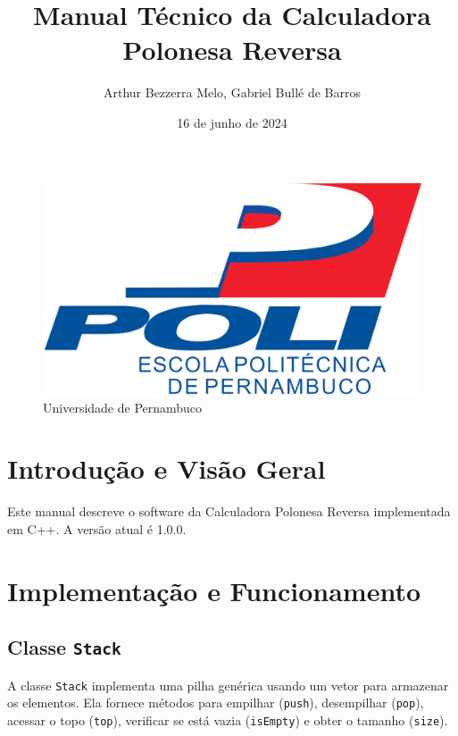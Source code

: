 \documentclass[twocolumn,a4paper,12pt]{article}
\title{Manual Técnico da Calculadora Polonesa Reversa}
\author{Arthur Bezzerra Melo, Gabriel Bullé de Barros}
\date{16 de junho de 2024}
\begin{document}
\maketitle

\begin{figure}[h]
    \centering
    \includegraphics[width=0.5\linewidth]{logo-poli.png}
    \caption{Universidade de Pernambuco}
    \label{fig:logo-poli.png}
\end{figure}

\section{Introdução e Visão Geral}

Este manual descreve o software da Calculadora Polonesa Reversa implementada em C++. A versão atual é 1.0.0.

\section{Implementação e Funcionamento}

\subsection{Classe \texttt{Stack}}
A classe \texttt{Stack} implementa uma pilha genérica usando um vetor para armazenar os elementos. Ela fornece métodos para empilhar (\texttt{push}), desempilhar (\texttt{pop}), acessar o topo (\texttt{top}), verificar se está vazia (\texttt{isEmpty}) e obter o tamanho (\texttt{size}).

\vspace{20pt}
\end{document}
